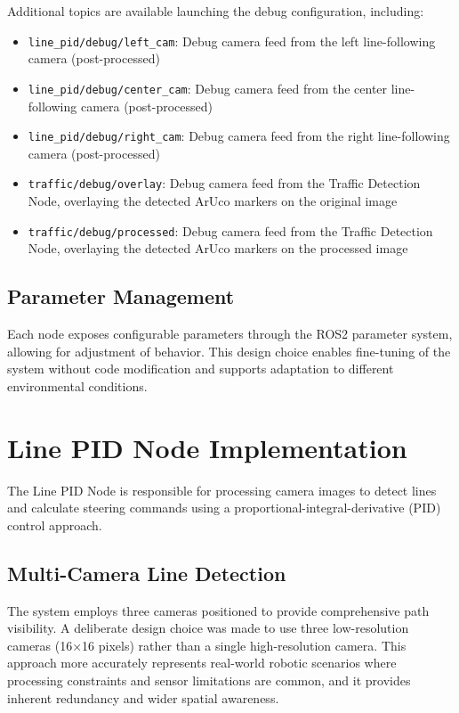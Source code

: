 \documentclass[9pt,technote]{IEEEtran}
\begin{document}
Additional topics are available launching the debug configuration, including:
\begin{itemize}
    \item \texttt{line\_pid/debug/left\_cam}: Debug camera feed from the left line-following camera (post-processed)
    \item \texttt{line\_pid/debug/center\_cam}: Debug camera feed from the center line-following camera (post-processed)
    \item \texttt{line\_pid/debug/right\_cam}: Debug camera feed from the right line-following camera (post-processed)
    \item \texttt{traffic/debug/overlay}: Debug camera feed from the Traffic Detection Node, overlaying the detected ArUco markers on the original image
    \item \texttt{traffic/debug/processed}: Debug camera feed from the Traffic Detection Node, overlaying the detected ArUco markers on the processed image
\end{itemize}


\subsection{Parameter Management}
Each node exposes configurable parameters through the ROS2 parameter system, allowing for adjustment of behavior. This design choice enables fine-tuning of the system without code modification and supports adaptation to different environmental conditions.

\section{Line PID Node Implementation}
The Line PID Node is responsible for processing camera images to detect lines and calculate steering commands using a proportional-integral-derivative (PID) control approach.

\subsection{Multi-Camera Line Detection}
The system employs three cameras positioned to provide comprehensive path visibility. A deliberate design choice was made to use three low-resolution cameras (16×16 pixels) rather than a single high-resolution camera. This approach more accurately represents real-world robotic scenarios where processing constraints and sensor limitations are common, and it provides inherent redundancy and wider spatial awareness.
\end{document}
